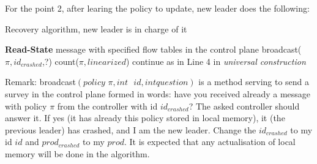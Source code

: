 \documentclass{article}
\theoremstyle{remark}
\begin{document}
For the point 2, after learing the policy to update, new leader does the following:\\
\begin{algorithm}
\caption{Recovery algorithm, new leader is in charge of it}
\begin{algorithmic}[1]
	\State \textbf{Read-State} message with specified flow tables
\EndFor
\State in the control plane broadcast($\pi , id_{crashed}$,?)
	\State count($\pi,linearized$)
	\EndIf
{}
\EndIf 
\State continue as in Line 4 in \emph{universal construction}
\end{algorithmic}
\end{algorithm}

Remark: broadcast$(\textit{policy }\pi, int \textit{ }id,int \textit{question})$ is a method serving to send a survey in the control plane formed in words: have you received already a message with policy $\pi$ from the controller with id $id_{crashed}$? The asked controller should answer it. If yes (it has already this policy stored in local memory), it (the previous leader) has crashed, and I am the new leader. Change the $id_{crashed}$ to my id $id$ and $prod_{crashed}$ to my $prod$.
It is expected that any actualisation of local memory will be done in the algorithm.
\end{document}
